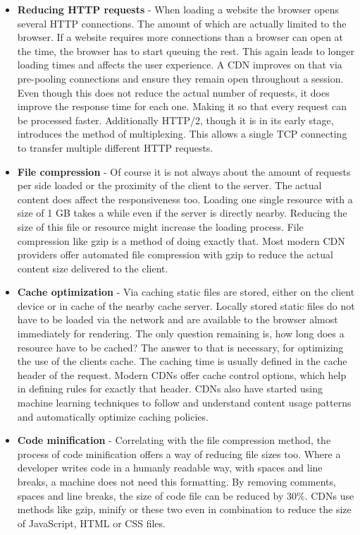 \begin{itemize}
	\item \textbf{Reducing HTTP requests} - When loading a website the browser opens several HTTP connections. The amount of which are actually limited to the browser. If a website requires more connections than a browser can open at the time, the browser has to start queuing the rest. This again leads to longer loading times and affects the user experience. A CDN improves on that via pre-pooling connections and ensure they remain open throughout a session. Even though this does not reduce the actual number of requests, it does improve the response time for each one. Making it so that every request can be processed faster. Additionally HTTP/2, though it is in its early stage, introduces the method of multiplexing. This allows a single TCP connecting to transfer multiple different HTTP requests.  
	
	\item \textbf{File compression} - Of course it is not always about the amount of requests per side loaded or the proximity of the client to the server. The actual content does affect the responsiveness too. Loading one single resource with a size of 1 GB takes a while even if the server is directly nearby. Reducing the size of this file or resource might increase the loading process. File compression like gzip is a method of doing exactly that. Most modern CDN providers offer automated file compression with gzip to reduce the actual content size delivered to the client.
	
	\item \textbf{Cache optimization} - Via caching static files are stored, either on the client device or in cache of the nearby cache server. Locally stored static files do not have to be loaded via the network and are available to the browser almost immediately for rendering. The only question remaining is, how long does a resource have to be cached? The answer to that is necessary, for optimizing the use of the clients cache. The caching time is usually defined in the cache header of the request. Modern CDNs offer cache control options, which help in defining rules for exactly that header.
	CDNs also have started using machine learning techniques to follow and understand content usage patterns and automatically optimize caching policies.
	 
	\item \textbf{Code minification} - Correlating with the file compression method, the process of code minification offers a way of reducing file sizes too. Where a developer writes code in a humanly readable way, with spaces and line breaks, a machine does not need this formatting. By removing comments, spaces and line breaks, the size of code file can be reduced by 30\%. CDNs use methods like gzip, minify or these two even in combination to reduce the size of JavaScript, HTML or CSS files.
	

\end{itemize}
